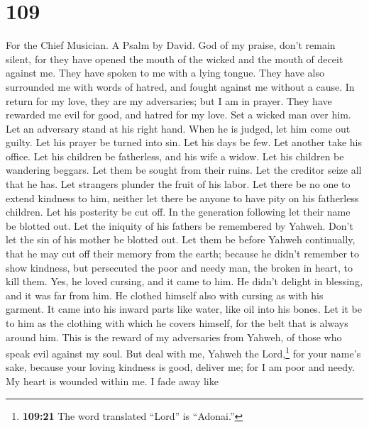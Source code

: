 \hypertarget{section-101}{%
\section{109}\label{section-101}}

For the Chief Musician. A Psalm by David.  God of my
praise, don't remain silent,  for they have opened the
mouth of the wicked and the mouth of deceit against me. They have spoken
to me with a lying tongue.  They have also surrounded me
with words of hatred, and fought against me without a cause.
 In return for my love, they are my adversaries; but I am
in prayer.  They have rewarded me evil for good, and
hatred for my love.  Set a wicked man over him. Let an
adversary stand at his right hand.  When he is judged, let
him come out guilty. Let his prayer be turned into sin. 
Let his days be few. Let another take his office.  Let his
children be fatherless, and his wife a widow.  Let his
children be wandering beggars. Let them be sought from their ruins.
 Let the creditor seize all that he has. Let strangers
plunder the fruit of his labor.  Let there be no one to
extend kindness to him, neither let there be anyone to have pity on his
fatherless children.  Let his posterity be cut off. In
the generation following let their name be blotted out. 
Let the iniquity of his fathers be remembered by Yahweh. Don't let the
sin of his mother be blotted out.  Let them be before
Yahweh continually, that he may cut off their memory from the earth;
 because he didn't remember to show kindness, but
persecuted the poor and needy man, the broken in heart, to kill them.
 Yes, he loved cursing, and it came to him. He didn't
delight in blessing, and it was far from him.  He clothed
himself also with cursing as with his garment. It came into his inward
parts like water, like oil into his bones.  Let it be to
him as the clothing with which he covers himself, for the belt that is
always around him.  This is the reward of my adversaries
from Yahweh, of those who speak evil against my soul. 
But deal with me, Yahweh the Lord,\footnote{\textbf{109:21} The word
  translated ``Lord'' is ``Adonai.''} for your name's sake, because your
loving kindness is good, deliver me;  for I am poor and
needy. My heart is wounded within me.  I fade away like
